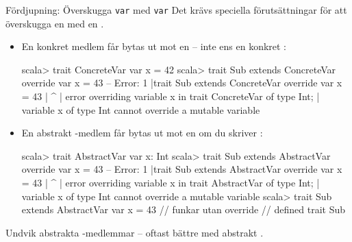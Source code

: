 \begin{Slide}{Fördjupning: Överskugga \texttt{var} med \texttt{var}}\SlideFontTiny
Det krävs speciella förutsättningar för att överskugga en  med en .
\begin{itemize}
\item En konkret medlem får  bytas ut mot en  -- inte ens en konkret :
\begin{REPLsmall}
scala> trait ConcreteVar { var x = 42 }
scala> trait Sub extends ConcreteVar { override var x = 43 }
-- Error:
1 |trait Sub extends ConcreteVar { override var x = 43 }
  |                                             ^
  |             error overriding variable x in trait ConcreteVar of type Int;
  |               variable x of type Int cannot override a mutable variable
\end{REPLsmall}
\item En abstrakt -medlem får bytas ut mot en  om du  skriver :
\begin{REPLsmall}
scala> trait AbstractVar { var x: Int }
scala> trait Sub extends AbstractVar { override var x = 43 }
-- Error:
1 |trait Sub extends AbstractVar { override var x = 43 }
  |                                             ^
  |             error overriding variable x in trait AbstractVar of type Int;
  |               variable x of type Int cannot override a mutable variable
scala> trait Sub extends AbstractVar { var x = 43 }   // funkar utan override
// defined trait Sub
\end{REPLsmall}
\end{itemize}
Undvik abstrakta -medlemmar -- oftast bättre med abstrakt .
\end{Slide}

